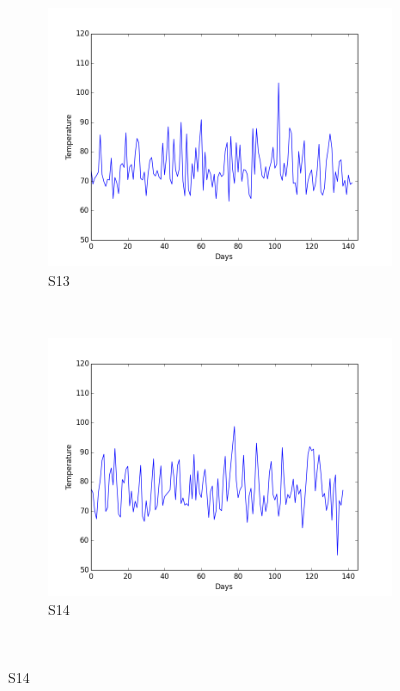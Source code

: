 \documentclass[12pt]{article} %
\begin{document}
\begin{figure}[H]
    \begin{subfigure}[b]{0.30\textwidth}
        \includegraphics[width=\textwidth]{img/graphs/13-heartrate-1}
        \caption{S13}
        \label{fig:s13HT}
    \end{subfigure}
    ~ %
    \begin{subfigure}[b]{0.30\textwidth}
        \includegraphics[width=\textwidth]{img/graphs/14-heartrate-1}
        \caption{S14}
        \label{fig:s14HT}
    \end{subfigure}
    ~ %

\end{figure}
\end{document}
